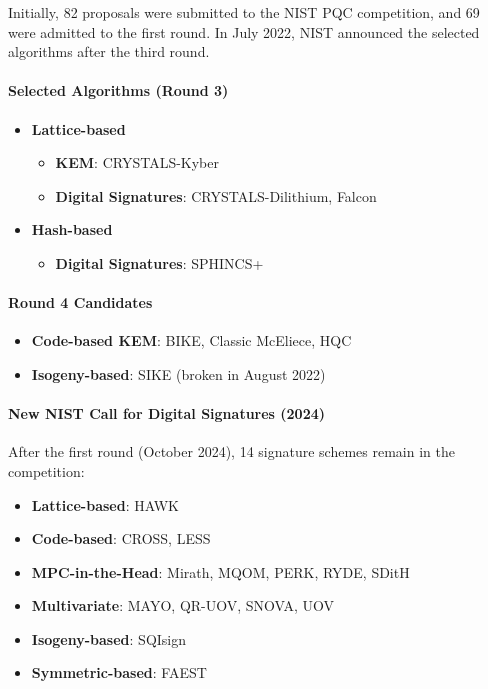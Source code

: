 \noindent
Initially, 82 proposals were submitted to the NIST PQC competition, and 69 were admitted to the first round. In July 2022, NIST announced the selected algorithms after the third round.

\paragraph{Selected Algorithms (Round 3)}

\begin{itemize}
    \item \textbf{Lattice-based}
    \begin{itemize}
        \item \textbf{KEM}: CRYSTALS-Kyber
        \item \textbf{Digital Signatures}: CRYSTALS-Dilithium, Falcon
    \end{itemize}
    
    \item \textbf{Hash-based}
    \begin{itemize}
        \item \textbf{Digital Signatures}: SPHINCS+
    \end{itemize}
\end{itemize}

\paragraph{Round 4 Candidates}

\begin{itemize}
    \item \textbf{Code-based KEM}: BIKE, Classic McEliece, HQC
    \item \textbf{Isogeny-based}: SIKE (broken in August 2022)
\end{itemize}

\paragraph{New NIST Call for Digital Signatures (2024)}

\noindent
After the first round (October 2024), 14 signature schemes remain in the competition:

\begin{itemize}
    \item \textbf{Lattice-based}: HAWK
    \item \textbf{Code-based}: CROSS, LESS
    \item \textbf{MPC-in-the-Head}: Mirath, MQOM, PERK, RYDE, SDitH
    \item \textbf{Multivariate}: MAYO, QR-UOV, SNOVA, UOV
    \item \textbf{Isogeny-based}: SQIsign
    \item \textbf{Symmetric-based}: FAEST
\end{itemize}


